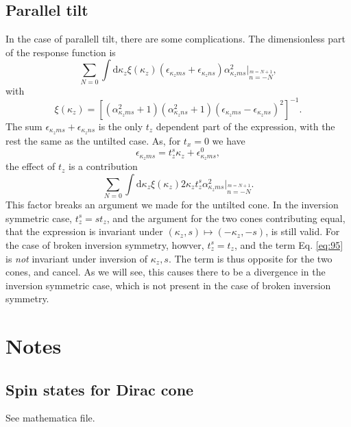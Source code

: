 \subsection{Parallel tilt}
In the case of parallell tilt, there are some complications.
The dimensionless part of the response function is
\[
  \sum\limits_{N=0}^{} \int \mathrm{d} \kappa_z
  \xi(\kappa_z) (\epsilon_{\kappa_z m s} + \epsilon_{\kappa_z n s}) \alpha_{\kappa_z m s}^2 |_{\overset{m=N+1}{n=-N}},
\]
with
\[
  \xi(\kappa_z) =
  \left[
    (\alpha_{\kappa_z m s}^2 + 1)
    (\alpha_{\kappa_z n s}^2 + 1)
    (\epsilon_{\kappa_z m s} - \epsilon_{\kappa_z n s})^2
  \right]^{-1}.
\]
The sum \( \epsilon_{\kappa_z m s } + \epsilon_{\kappa_z n s} \) is the only \( t_z \) dependent part of the expression, with the rest the same as the untilted case.
As, for \( t_x = 0 \) we have
\[
\epsilon_{\kappa_z m s} = t_z^s \kappa_z + \epsilon^0_{\kappa_z m s},
\]
the effect of \( t_z \) is a contribution
\begin{equation}
  \label{eq:95}
  \sum\limits_{N=0}^{} \int \mathrm{d} \kappa_z
  \xi(\kappa_z) 2 \kappa_z t_z^s \alpha_{\kappa_z m s}^2 |_{\overset{m=N+1}{n=-N}}.
\end{equation}
This factor breaks an argument we made for the untilted cone.
In the inversion symmetric case, \( t^s_z = s t_z \), and the argument for the two cones contributing equal, that the expression is invariant under \( (\kappa_z, s) \mapsto (-\kappa_z, -s) \), is still valid.
For the case of broken inversion symmetry, howver, \( t_z^s = t_z \), and the term Eq. \eqref{eq:95} is \emph{not} invariant under inversion of \( \kappa_z, s \).
The term is thus opposite for the two cones, and cancel.
As we will see, this causes there to be a divergence in the inversion symmetric case, which is not present in the case of broken inversion symmetry.


\section{Notes}
\subsection{Spin states for Dirac cone}
See mathematica file.

